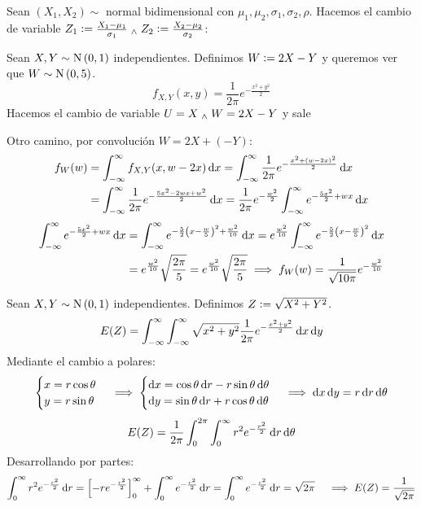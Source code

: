  Sean $(X_1, X_2) \sim$ normal bidimensional con $\mu_1, \mu_2, \sigma_1, \sigma_2, \rho$. Hacemos el cambio de variable $Z_1 \vcentcolon= \frac{X_1-\mu_1}{\sigma_1} \; _{\wedge} \; Z_2 \vcentcolon= \frac{X_2-\mu_2}{\sigma_2}$: %

 Sean $X, Y \sim \operatorname{N}\left(0, 1\right)$ independientes. Definimos $W\vcentcolon= 2X-Y$ y queremos ver que $W\sim\operatorname{N}\left(0, 5\right)$.
\[f_{X, Y} (x,y) = \frac{1}{2\pi} e^{-\frac{x^2+y^2}{2}}\]
Hacemos el cambio de variable $U = X \; _{\wedge} \; W=2X-Y$ y sale %

Otro camino, por convolución $W=2X+(-Y)$:
\[\begin{aligned}
		f_{W} (w) & = \int_{-\infty}^{\infty} f_{X, Y} (x, w-2x) \odif{x} = \int_{-\infty}^{\infty} \frac{1}{2\pi} e^{-\frac{x^2+(w-2x)^2}{2}} \odif{x}                                       \\
		          & = \int_{-\infty}^{\infty} \frac{1}{2\pi} e^{-\frac{5x^2-2wx+w^2}{2}} \odif{x} = \frac{1}{2\pi} e^{-\frac{w^2}{2}} \int_{-\infty}^{\infty} e^{-\frac{5x^2}{2}+wx} \odif{x}
	\end{aligned}\]
\[\begin{aligned}
		\int_{-\infty}^{\infty} e^{-\frac{5x^2}{2}+wx} \odif{x} & = \int_{-\infty}^{\infty} e^{-\frac{5}{2}\left(x-\frac{w}{5}\right)^2+\frac{w^2}{10}} \odif{x} = e^{\frac{w^2}{10}} \int_{-\infty}^{\infty} e^{-\frac{5}{2}\left(x-\frac{w}{5}\right)^2} \odif{x} \\
		                                                        & = e^{\frac{w^2}{10}} \sqrt{\frac{2\pi}{5}} = e^{\frac{w^2}{10}} \sqrt{\frac{2\pi}{5}} \implies f_W(w) = \frac{1}{\sqrt{10\pi}} e^{-\frac{w^2}{10}}
	\end{aligned}\]


 Sean $X, Y \sim \operatorname{N}\left(0, 1\right)$ independientes. Definimos $Z\vcentcolon= \sqrt{X^2 + Y^2}$.
\[E(Z) = \int_{-\infty}^{\infty} \int_{-\infty}^{\infty} \sqrt{x^2 + y^2} \frac{1}{2\pi} e^{-\frac{x^2+y^2}{2}} \odif{x}\odif{y}\]
Mediante el cambio a polares:
\[\begin{aligned}
		\begin{cases}
			x = r\cos{\theta} \\
			y = r\sin{\theta}
		\end{cases} \implies \begin{cases}
			                     \odif{x} = \cos{\theta}\odif{r} - r\sin{\theta}\odif{\theta} \\
			                     \odif{y} = \sin{\theta}\odif{r} + r\cos{\theta}\odif{\theta}
		                     \end{cases} \implies \odif{x}\odif{y} = r\odif{r}\odif{\theta}
	\end{aligned}\]
\[E(Z) = \frac{1}{2\pi}\int_{0}^{2\pi} \int_{0}^{\infty} r^2e^{-\frac{r^2}{2}} \odif{r}\odif{\theta} \]
Desarrollando por partes:
\[\begin{aligned}
		\int_{0}^{\infty} r^2e^{-\frac{r^2}{2}} \odif{r} & = \left[-r e^{-\frac{r^2}{2}}\right]_{0}^{\infty} + \int_{0}^{\infty} e^{-\frac{r^2}{2}} \odif{r} = \int_{0}^{\infty} e^{-\frac{r^2}{2}} \odif{r} = \sqrt{2\pi}
	\end{aligned} \implies E(Z) = \frac{1}{\sqrt{2\pi}}\]

